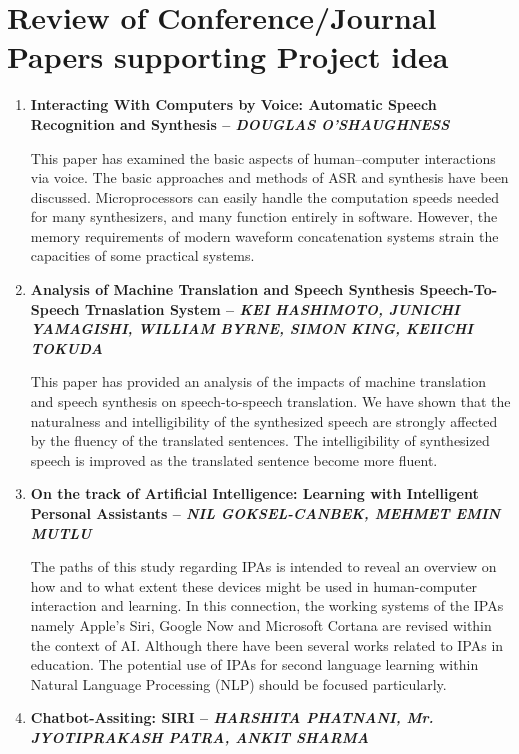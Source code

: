 \documentclass[16pt,oneside,a4paper]{article}
\begin{document}
\section{Review of Conference/Journal Papers supporting Project idea}
\label{sec:survey}
\begin{enumerate}
\item \textbf{Interacting With Computers by Voice: Automatic Speech Recognition and Synthesis -- \textit{DOUGLAS O’SHAUGHNESS}}\

This paper has examined the basic aspects of human–computer interactions via voice. The basic approaches and methods of ASR and synthesis have been discussed. Microprocessors can easily handle the computation speeds needed for many synthesizers, and many function entirely in software. However, the memory requirements of modern waveform concatenation systems strain the capacities of some practical systems.\\

\item \textbf{Analysis of Machine Translation and Speech Synthesis Speech-To-Speech Trnaslation System -- \textit{KEI HASHIMOTO, JUNICHI YAMAGISHI, WILLIAM BYRNE, SIMON KING, KEIICHI TOKUDA}}

This paper has provided an analysis of the impacts of machine translation and speech synthesis on speech-to-speech translation. We have shown that the naturalness and intelligibility of the synthesized speech are strongly affected by the ﬂuency of the translated sentences. The intelligibility of synthesized speech is improved as the translated sentence become more ﬂuent.\\

\item \textbf{On the track of Artificial Intelligence: Learning with Intelligent Personal Assistants -- \textit{NIL GOKSEL-CANBEK, MEHMET EMIN MUTLU}}

The paths of this study regarding IPAs is intended to reveal an overview on how and to what extent these devices might be used in human-computer interaction and learning. In this connection, the working systems of the IPAs namely Apple’s Siri, Google Now and Microsoft Cortana are revised within the context of AI. Although there have been several works related to IPAs in education. The potential use of IPAs for second language learning within Natural Language Processing (NLP) should be focused particularly.\\

\item \textbf{Chatbot-Assiting: SIRI -- \textit{HARSHITA PHATNANI, Mr. JYOTIPRAKASH PATRA, ANKIT SHARMA}}


\end{enumerate}
\end{document}
